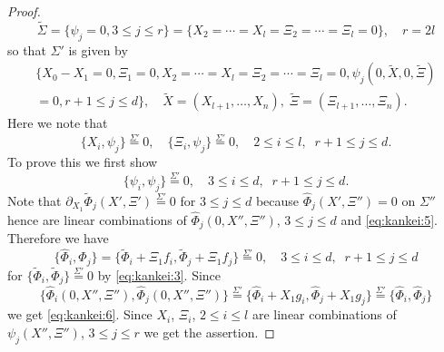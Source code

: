 \documentclass[12pt,leqno]{article} %
\def\dif{\partial}
\def\sieq{\overset{\Sigma'}{=}}
\numberwithin{equation}{section}
\begin{document}
\begin{proof}
%
\[
\tilde\Sigma=\{\psi_j=0, 3\leq j\leq r\}=\{X_2=\cdots=X_{l}=\Xi_2=\cdots=\Xi_{l}=0\},\quad r=2l
\]
%
so that $\Sigma'$ is given by
%
\begin{gather*}
\{X_0-X_1=0,\Xi_1=0,X_2=\cdots=X_{l}=\Xi_2=\cdots=\Xi_{l}=0, 
\psi_j(0, \tilde X,0,\tilde\Xi)\\
=0, r+1\leq j\leq d\},\quad \tilde X=(X_{l+1},\ldots,X_n),\;\tilde\Xi=(\Xi_{l+1},\ldots,\Xi_n).
\end{gather*}
%
%
Here we note that
%
\begin{equation}
\label{eq:kankei:add}
\{X_i, \psi_j\}\sieq 0,\quad \{\Xi_i,\psi_j\}\sieq 0,\quad 2\leq i\leq l,\;\;r+1\leq j\leq d.
\end{equation}
%
To prove this we first show
%
\begin{equation}
\label{eq:kankei:6}
\{\psi_i,\psi_j\}\sieq 0,\quad 3\leq i\leq d,\;\;r+1\leq j\leq d.
\end{equation}
%
 Note that $\dif_{X_1}\tilde\Phi_j(X',\Xi')\sieq 0$ for $3\leq j\leq d$ because $\hat\Phi_j(X',\Xi'')=0$ on $\Sigma''$ hence are linear combinations of $\hat\Phi_j(0,X'',\Xi'')$, $3\leq j\leq d$ and \eqref{eq:kankei:5}. Therefore we have
%
\begin{equation}
\label{eq:kankei:8}
\{\hat\Phi_i,\hat\Phi_j\}=\{\tilde\Phi_i+\Xi_1f_i,\tilde\Phi_j+\Xi_1f_j\}\sieq 0,\quad 3\leq i\leq d,\;\;r+1\leq j\leq d
\end{equation}
%
for $\{\tilde\Phi_i,\tilde\Phi_j\}\sieq 0$ by \eqref{eq:kankei:3}. Since 
%
\[
\{\hat\Phi_i(0,X'',\Xi''),\hat\Phi_j(0,X'',\Xi'')\}\sieq \{\hat\Phi_i+X_1g_i,\hat\Phi_j+X_1g_j\}\sieq \{\hat\Phi_i,\hat\Phi_j\}
\]
%
we get \eqref{eq:kankei:6}. Since $X_i$, $\Xi_i$, $2\leq i\leq l$ are linear combinations of $\psi_j(X'',\Xi'')$, $3\leq j\leq r$ we get the assertion.


\end{proof}
\end{document}
